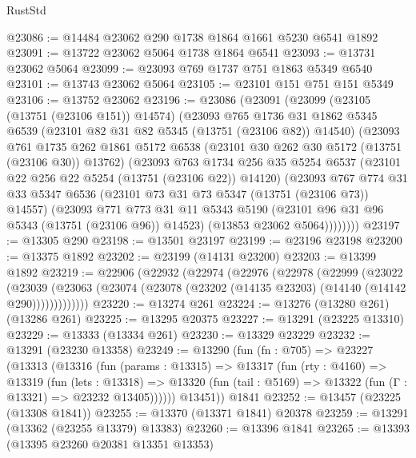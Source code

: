 \begin{lexlean}{RustStd}
\begin{coremodule}
@23086 := @14484 @23062 @290 @1738 @1864 @1661 @5230 @6541 @1892
@23091 := @13722 @23062 @5064 @1738 @1864 @6541
@23093 := @13731 @23062 @5064
@23099 := @23093 @769 @1737 @751 @1863 @5349 @6540
@23101 := @13743 @23062 @5064
@23105 := @23101 @151 @751 @151 @5349
@23106 := @13752 @23062
@23196 := @23086
    (@23091
      (@23099
        (@23105 (@13751 (@23106 @151)) @14574)
        (@23093
          @765
          @1736
          @31
          @1862
          @5345
          @6539
          (@23101 @82 @31 @82 @5345 (@13751 (@23106 @82)) @14540)
          (@23093
            @761
            @1735
            @262
            @1861
            @5172
            @6538
            (@23101 @30 @262 @30 @5172 (@13751 (@23106 @30)) @13762)
            (@23093
              @763
              @1734
              @256
              @35
              @5254
              @6537
              (@23101 @22 @256 @22 @5254 (@13751 (@23106 @22)) @14120)
              (@23093
                @767
                @774
                @31
                @33
                @5347
                @6536
                (@23101 @73 @31 @73 @5347 (@13751 (@23106 @73)) @14557)
                (@23093
                  @771
                  @773
                  @31
                  @11
                  @5343
                  @5190
                  (@23101 @96 @31 @96 @5343 (@13751 (@23106 @96)) @14523)
                  (@13853 @23062 @5064))))))))
@23197 := @13305 @290
@23198 := @13501 @23197
@23199 := @23196 @23198
@23200 := @13375 @1892
@23202 := @23199 (@14131 @23200)
@23203 := @13399 @1892
@23219 := @22906
    (@22932
      (@22974
        (@22976
          (@22978
            (@22999
              (@23022
                (@23039
                  (@23063 (@23074 (@23078 (@23202 (@14135 @23203) (@14140 (@14142 @290)))))))))))))
@23220 := @13274 @261
@23224 := @13276 (@13280 @261) (@13286 @261)
@23225 := @13295 @20375
@23227 := @13291 (@23225 @13310)
@23229 := @13333 (@13334 @261)
@23230 := @13329 @23229
@23232 := @13291 (@23230 @13358)
@23249 := @13290
    (fun (fn : @705) =>
    @23227
      (@13313
        (@13316
          (fun (params : @13315) =>
          @13317
            (fun (rty : @4160) =>
            @13319
              (fun (lets : @13318) =>
              @13320 (fun (tail : @5169) => @13322 (fun (Γ : @13321) => @23232 @13405))))))
        @13451))
    @1841
@23252 := @13457 (@23225 (@13308 @1841))
@23255 := @13370 (@13371 @1841) @20378
@23259 := @13291 (@13362 (@23255 @13379) @13383)
@23260 := @13396 @1841
@23265 := @13393 (@13395 @23260 @20381 @13351 @13353)

\end{coremodule}
\end{lexlean}
